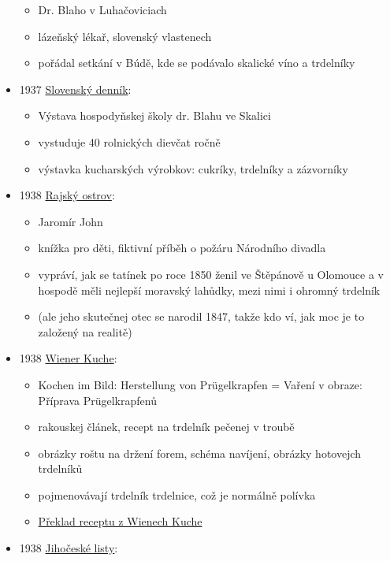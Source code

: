 \begin{itemize}
  \begin{itemize}
  \tightlist
  \item
    Dr. Blaho v Luhačoviciach
  \item
    lázeňský lékař, slovenský vlastenech
  \item
    pořádal setkání v Búdě, kde se podávalo skalické víno a trdelníky
  \end{itemize}
\item
  1937
  \href{https://dikda.snk.sk/uuid/uuid:5dd3499d-de07-4a5e-ab8a-f52a6c881c09}{Slovenský
  denník}:

  \begin{itemize}
  \tightlist
  \item
    Výstava hospodyňskej školy dr. Blahu ve Skalici
  \item
    vystuduje 40 rolnických dievčat ročně
  \item
    výstavka kucharských výrobkov: cukríky, trdelníky a zázvorníky
  \end{itemize}
\item
  1938
  \href{https://ndk.cz/view/uuid:001e82b0-302a-11e9-b81e-005056827e52?page=uuid\%3A3123a720-50df-11e9-8854-005056827e51&fulltext=trdeln\%C3\%ADk}{Rajský
  ostrov}:

  \begin{itemize}
  \tightlist
  \item
    Jaromír John
  \item
    knížka pro děti, fiktivní příběh o požáru Národního divadla
  \item
    vypráví, jak se tatínek po roce 1850 ženil ve Štěpánově u Olomouce a
    v hospodě měli nejlepší moravský lahůdky, mezi nimi i ohromný
    trdelník
  \item
    (ale jeho skutečnej otec se narodil 1847, takže kdo ví, jak moc je
    to založený na realitě)
  \end{itemize}
\item
  1938
  \href{https://web.archive.org/web/20201230125915/http://kurtos.eu/dl/11664.pdf}{Wiener
  Kuche}:

  \begin{itemize}
  \tightlist
  \item
    Kochen im Bild: Herstellung von Prügelkrapfen = Vaření v obraze:
    Příprava Prügelkrapfenů
  \item
    rakouskej článek, recept na trdelník pečenej v troubě
  \item
    obrázky roštu na držení forem, schéma navíjení, obrázky hotovejch
    trdelníků
  \item
    pojmenovávají trdelník trdelnice, což je normálně polívka
  \item
    \hyperref[250615-0047]{Překlad receptu z Wienech Kuche}
  \end{itemize}
\item
  1938
  \href{https://ceskadigitalniknihovna.cz/uuid/uuid:e6636d2b-f486-4e2f-b5ae-fb4e89b772e4}{Jihočeské
  listy}:


\end{itemize}
